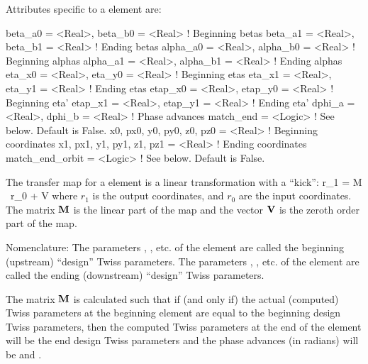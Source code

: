 {Attributes specific to a  element are:
\begin{example}
  beta_a0   = <Real>,  beta_b0  = <Real>   ! Beginning betas
  beta_a1   = <Real>,  beta_b1  = <Real>   ! Ending betas
  alpha_a0  = <Real>,  alpha_b0 = <Real>   ! Beginning alphas
  alpha_a1  = <Real>,  alpha_b1 = <Real>   ! Ending alphas
  eta_x0    = <Real>,  eta_y0   = <Real>   ! Beginning etas 
  eta_x1    = <Real>,  eta_y1   = <Real>   ! Ending etas 
  etap_x0   = <Real>,  etap_y0  = <Real>   ! Beginning eta' 
  etap_x1   = <Real>,  etap_y1  = <Real>   ! Ending eta'
  dphi_a    = <Real>,  dphi_b   = <Real>   ! Phase advances
  match_end = <Logic>                      ! See below. Default is False.
  x0, px0, y0, py0, z0, pz0 = <Real>       ! Beginning coordinates
  x1, px1, y1, py1, z1, pz1 = <Real>       ! Ending coordinates
  match_end_orbit = <Logic>                ! See below. Default is False.
\end{example}

The transfer map for a  element is a linear transformation 
with a ``kick'':
\Begineq
  r_1 = \Bf M \, r_0 + \Bf V 
\Endeq
where $r_1$ is the output coordinates, and $r_0$ are the input
coordinates. The matrix ${\bf M}$ is the linear part of the map and the
vector ${\bf V}$ is the zeroth order part of the map.

Nomenclature: The parameters , , etc. of the
 element are called the beginning (upstream) ``design''
Twiss parameters. The parameters , , etc. of
the  element are called the ending (downstream) ``design'' Twiss
parameters.

The matrix ${\bf M}$ is calculated such that if (and only if) the actual
(computed) Twiss parameters at the beginning  element are
equal to the beginning design Twiss parameters, then the computed
Twiss parameters at the end of the  element will be the end
design Twiss parameters and the phase advances (in radians) will be
 and .

}
